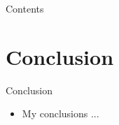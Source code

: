 

\frame{\titlepage}

\begin{frame}{Contents}
  \tableofcontents
\end{frame}







\section{Conclusion}
\begin{frame}{Conclusion}
    \begin{itemize}
    \item My conclusions ...
  \end{itemize}
\end{frame}





%  
%  

